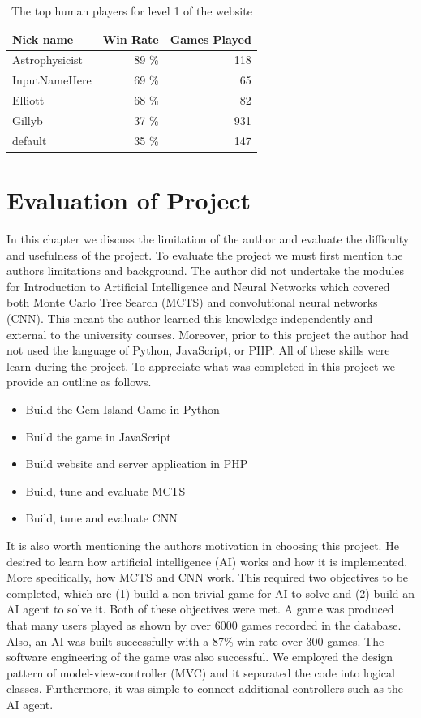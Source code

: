 \documentclass{bhamthesis}
\theoremstyle{definition}
\begin{document}
\begin{table}[]
	\centering
	\caption{The top human players for level 1 of the website}
	\label{t:humanWinRates}
	\begin{tabular}{lrr}
		\hline
		Nick name      & Win Rate & Games Played \\ \hline
		Astrophysicist & 89 \%    & 118         \\
		InputNameHere  & 69 \%    & 65          \\
		Elliott        & 68 \%    & 82          \\
		Gillyb         & 37 \%    & 931         \\
		default        & 35 \%    & 147        
	\end{tabular}
\end{table}


\chapter{Evaluation of Project}
In this chapter we discuss the limitation of the author and evaluate the difficulty and usefulness of the project.
To evaluate the project we must first mention the authors limitations and background. The author did not undertake the modules for Introduction to Artificial Intelligence and Neural Networks which covered both Monte Carlo Tree Search (MCTS) and convolutional neural networks (CNN). This meant the author learned this knowledge independently and external to the university courses. Moreover, prior to this project the author had not used the language of Python, JavaScript, or PHP. All of these skills were learn during the project.
To appreciate what was completed in this project we provide an outline as follows.
\begin{itemize}
	\item Build the Gem Island Game in Python
	\item Build the game in JavaScript
	\item Build website and server application in PHP
	\item Build, tune and evaluate MCTS
	\item Build, tune and evaluate CNN
\end{itemize}

It is also worth mentioning the authors motivation in choosing this project. He desired to learn how artificial intelligence (AI) works and how it is implemented. More specifically, how MCTS and CNN work. This required two objectives to be completed, which are (1) build a non-trivial game for AI to solve and (2) build an AI agent to solve it. Both of these objectives were met. A game was produced that many users played as shown by over 6000 games recorded in the database. Also, an AI was built successfully with a 87\% win rate over 300 games. 
The software engineering of the game was also successful. We employed the design pattern of model-view-controller (MVC) and it separated the code into logical classes. Furthermore, it was simple to connect additional controllers such as the AI agent.
\end{document}
